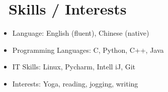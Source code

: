 \documentclass{resume}
\begin{document}
\section{\faCogs\ Skills / Interests}
\begin{itemize}[parsep=0.5ex]
  \item Language: English (fluent), Chinese (native)
  \item Programming Languages: C, Python, C++, Java
  \item IT Skills: Linux, Pycharm, Intell iJ, Git
  \item Interests: Yoga, reading, jogging, writing
\end{itemize}

%
%
\end{document}
